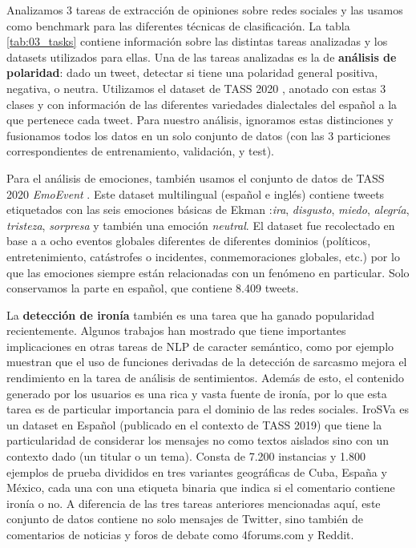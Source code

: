 Analizamos 3 tareas de extracción de opiniones sobre redes sociales y las usamos como benchmark para las diferentes técnicas de clasificación. La tabla \ref{tab:03_tasks} contiene información sobre las distintas tareas analizadas y los datasets utilizados para ellas. Una de las tareas analizadas es la de \textbf{análisis de polaridad}: dado un tweet, detectar si tiene una polaridad general positiva, negativa, o neutra. Utilizamos el dataset de TASS 2020 \cite{garcia2020overview}, anotado con estas 3 clases y con información de las diferentes variedades dialectales del español a la que pertenece cada tweet. Para nuestro análisis, ignoramos estas distinciones y fusionamos todos los datos en un solo conjunto de datos (con las 3 particiones correspondientes de entrenamiento, validación, y test).


Para el análisis de emociones, también usamos el conjunto de datos de TASS 2020 \emph{EmoEvent} \cite{plaza-del-arco-etal-2020-emoevent}. Este dataset multilingual (español e inglés) contiene tweets etiquetados con las seis emociones básicas de Ekman \cite{ekman1992argument} :\emph {ira}, \emph {disgusto}, \emph {miedo}, \emph {alegría}, \emph {tristeza}, \emph {sorpresa} y también una emoción \emph{neutral}. El dataset fue recolectado en base a a ocho eventos globales diferentes de diferentes dominios (políticos, entretenimiento, catástrofes o incidentes, conmemoraciones globales, etc.) por lo que las emociones siempre están relacionadas con un fenómeno en particular. Solo conservamos la parte en español, que contiene 8.409 tweets.


 La \textbf{detección de ironía} también es una tarea que ha ganado popularidad recientemente. Algunos trabajos han mostrado que tiene importantes implicaciones en otras tareas de NLP de caracter semántico, como por ejemplo \citet{gupta-yang-2017-crystalnest} muestran que el uso de funciones derivadas de la detección de sarcasmo mejora el rendimiento en la tarea de análisis de sentimientos. Además de esto, el contenido generado por los usuarios es una rica y vasta fuente de ironía, por lo que esta tarea es de particular importancia para el dominio de las redes sociales. IroSVa \cite {ortega2019overview} es un dataset en Español (publicado en el contexto de TASS 2019) que tiene la particularidad de considerar los mensajes no como textos aislados sino con un contexto dado (un titular o un tema). Consta de 7.200 instancias y 1.800 ejemplos de prueba divididos en tres variantes geográficas de Cuba, España y México, cada una con una etiqueta binaria que indica si el comentario contiene ironía o no. A diferencia de las tres tareas anteriores mencionadas aquí, este conjunto de datos contiene no solo mensajes de Twitter, sino también de comentarios de noticias y foros de debate como 4forums.com y Reddit.

